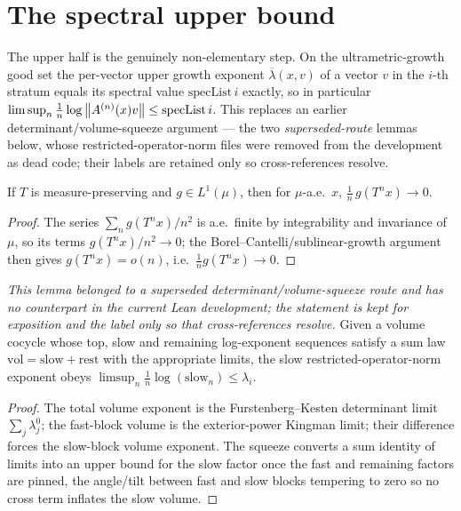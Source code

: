 \section{The spectral upper bound}

The upper half is the genuinely non-elementary step. On the ultrametric-growth good set the
per-vector upper growth exponent \(\overline\lambda(x,v)\) of a vector \(v\) in the \(i\)-th
stratum equals its spectral value \(\mathrm{specList}\,i\) exactly, so in particular
\(\limsup_n\tfrac1n\log\left\lVert A^{(n)}(x)v \right\rVert\le\mathrm{specList}\,i\). This replaces an earlier
determinant/volume-squeeze argument --- the two \emph{superseded-route} lemmas below, whose
restricted-operator-norm files were removed from the development as dead code; their labels are
retained only so cross-references resolve.

\begin{lemma}[Tempering]\label{tempering_posLog}
  \leanok
  If \(T\) is measure-preserving and \(g\in L^1(\mu)\), then for \(\mu\)-a.e.\ \(x\),
  \(\tfrac1n\,g(T^n x)\to 0\).
\end{lemma}
\begin{proof}\leanok
  The series \(\sum_n g(T^n x)/n^{2}\) is a.e.\ finite by integrability and invariance of \(\mu\),
  so its terms \(g(T^n x)/n^2\to0\); the Borel--Cantelli/sublinear-growth argument then gives
  \(g(T^n x)=o(n)\), i.e.\ \(\tfrac1n g(T^n x)\to0\).
\end{proof}

\begin{lemma}\label{limsup_topSlow_le_of_squeeze}
  \emph{This lemma belonged to a superseded determinant/volume-squeeze route and has no counterpart
  in the current Lean development; the statement is kept for exposition and the label only so that
  cross-references resolve.}
  Given a volume cocycle whose top, slow and remaining log-exponent sequences satisfy a sum law
  \(\mathrm{vol} = \mathrm{slow} + \mathrm{rest}\) with the appropriate limits, the slow
  restricted-operator-norm exponent obeys
  \(\limsup_n \tfrac1n\log(\mathrm{slow}_n) \le \lambda_i\).
\end{lemma}
\begin{proof}
  The total volume exponent is the Furstenberg--Kesten determinant limit \(\sum_j\lambda^0_j\); the
  fast-block volume is the exterior-power Kingman limit; their difference forces the slow-block
  volume exponent. The squeeze converts a sum identity of limits into an upper bound for the slow
  factor once the fast and remaining factors are pinned, the angle/tilt between fast and slow
  blocks tempering to zero so no cross term inflates the slow volume.
\end{proof}

